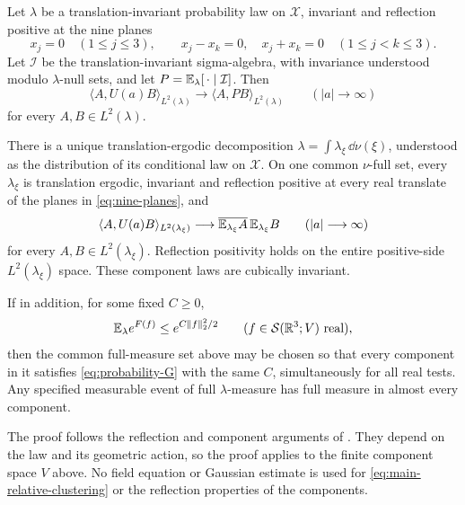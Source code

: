 \begin{theorem}\label{thm:components-clustering}
Let \(\lambda\) be a translation-invariant probability law on
\(\mathcal X\), invariant and reflection positive at the nine planes
\begin{equation}\label{eq:nine-planes}
 x_j=0\quad(1\le j\le3),\qquad
 x_j-x_k=0,\quad x_j+x_k=0\quad(1\le j<k\le3).
\end{equation}
Let \(\mathcal I\) be the translation-invariant sigma-algebra,
with invariance understood modulo \(\lambda\)-null sets, and let
\(P=\mathbb E_\lambda[\,\cdot\mid\mathcal I]\). Then
\begin{equation}\label{eq:main-relative-clustering}
 \langle A,U(a)B\rangle_{L^2(\lambda)}
 \longrightarrow\langle A,PB\rangle_{L^2(\lambda)}
 \qquad(|a|\longrightarrow\infty)
\end{equation}
for every \(A,B\in L^2(\lambda)\).

There is a unique translation-ergodic decomposition
\(\lambda=\int\lambda_\xi\,\dd\nu(\xi)\), understood as the
distribution of its conditional law on \(\mathcal X\).
On one common \(\nu\)-full set, every \(\lambda_\xi\) is
translation ergodic, invariant and reflection positive at every
real translate of the planes in \eqref{eq:nine-planes}, and
\begin{equation}\label{eq:main-component-clustering}
 \langle A,U(a)B\rangle_{L^2(\lambda_\xi)}
 \longrightarrow
 \overline{\mathbb E_{\lambda_\xi}A}\,\mathbb E_{\lambda_\xi}B
 \qquad(|a|\longrightarrow\infty)
\end{equation}
for every \(A,B\in L^2(\lambda_\xi)\).
Reflection positivity holds on the entire positive-side
\(L^2(\lambda_\xi)\) space. These component laws are cubically invariant.

If in addition, for some fixed \(C\ge0\),
\begin{equation}\label{eq:probability-G}
 \mathbb E_\lambda e^{F(f)}\le e^{C\|f\|_2^2/2}
 \qquad(f\in\mathcal S(\mathbb R^3;V)\text{ real}),
\end{equation}
then the common full-measure set above may be chosen so that every
component in it satisfies \eqref{eq:probability-G} with the same
\(C\), simultaneously for all real tests.
Any specified measurable event of full \(\lambda\)-measure has
full measure in almost every component.
\end{theorem}

The proof follows the reflection and component arguments of
\cite[Section~7]{QED3Manuscript}. They depend on the law and its
geometric action, so the proof applies to the finite component
space \(V\) above. No field equation or Gaussian estimate is used
for \eqref{eq:main-relative-clustering} or the reflection properties
of the components.


